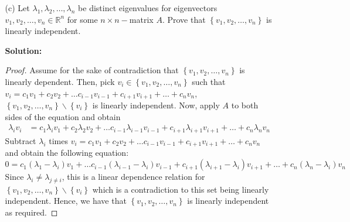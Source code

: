 \documentclass[letterpaper,12pt]{article}
\newcommand{\set}[1]{\left\{ #1 \right\}}
\theoremstyle{definition}
\begin{document}
\begin{itemize}
    \item[] \begin{enumerate}
        \item[(c)] Let $\lambda_1,\lambda_2,\ldots,\lambda_n$ be distinct eigenvalues for eigenvectors $v_1,v_2,\ldots,v_n \in \mathbb{R}^n$ for some $n\times n-$matrix $A$. Prove that $\set{v_1,v_2,\ldots,v_n}$ is linearly independent.
        \begin{mdframed}
            \textbf{Solution:}
            \begin{proof}
  Assume for the sake of contradiction that $\left \{v_1,v_2,\ldots,v_n\right \}$ is linearly dependent. Then, pick $v_i \in \left \{v_1,v_2,\ldots,v_n\right \}$ such that $v_i = c_1v_1 + c_2v_2 + \ldots c_{i-1}v_{i-1} + c_{i+1}v_{i+1} + \ldots + c_nv_n$, $\left \{v_1,v_2,\ldots,v_n\right \} \backslash \set{v_i}$ is linearly independent. Now, apply $A$ to both sides of the equation and obtain
  \begin{align*}
      \lambda_iv_i &= c_1\lambda_iv_1 + c_2\lambda_2v_2 + \ldots c_{i-1}\lambda_{i-1}v_{i-1} + c_{i+1}\lambda_{i+1}v_{i+1} + \ldots + c_n\lambda_nv_n
  \end{align*}
  Subtract $\lambda_i$ times $v_i = c_1v_1 + c_2v_2 + \ldots c_{i-1}v_{i-1} + c_{i+1}v_{i+1} + \ldots + c_nv_n$ and obtain the following equation: $$0 = c_1(\lambda_1-\lambda_i)v_1 + \ldots c_{i-1}(\lambda_{i-1}-\lambda_i)v_{i-1} + c_{i+1}(\lambda_{i+1}-\lambda_i)v_{i+1} + \ldots + c_n(\lambda_n-\lambda_i)v_n$$ Since $\lambda_i \neq \lambda_{j\neq i}$, this is a linear dependence relation for $\left \{v_1,v_2,\ldots,v_n\right \} \backslash \set{v_i}$ which is a contradiction to this set being linearly independent. Hence, we have that $\left \{v_1,v_2,\ldots,v_n\right \}$ is linearly independent as required.
\end{proof}
        \end{mdframed}
    \end{enumerate}
\end{itemize}
\pagebreak
\end{document}
